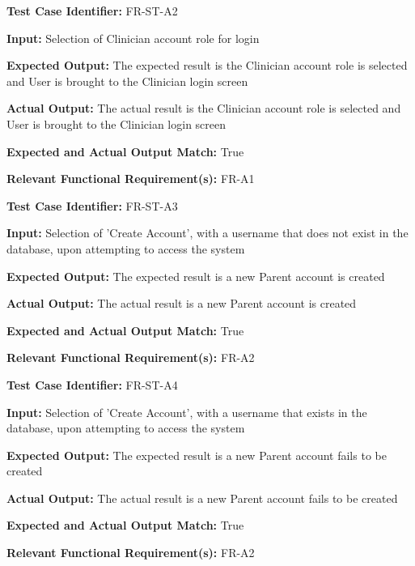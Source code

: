 \documentclass[12pt, titlepage]{article}
\begin{document}
\begin{mdframed}[linewidth=0.5mm] \par
  \textbf{Test Case Identifier:} FR-ST-A2 \par
  \textbf{Input:} Selection of Clinician account role for login \par
  \textbf{Expected Output:} The expected result is the Clinician account role is selected and User is brought to the Clinician login screen \par
  \textbf{Actual Output:} The actual result is the Clinician account role is selected and User is brought to the Clinician login screen \par
  \textbf{Expected and Actual Output Match:} True \par
  \textbf{Relevant Functional Requirement(s):} FR-A1
\end{mdframed}

\begin{mdframed}[linewidth=0.5mm] \par
  \textbf{Test Case Identifier:} FR-ST-A3 \par
  \textbf{Input:} Selection of 'Create Account', with a username that does not exist in the database, upon attempting to access the system \par
  \textbf{Expected Output:} The expected result is a new Parent account is created \par
  \textbf{Actual Output:} The actual result is a new Parent account is created \par
  \textbf{Expected and Actual Output Match:} True \par
  \textbf{Relevant Functional Requirement(s):} FR-A2
\end{mdframed}

\begin{mdframed}[linewidth=0.5mm] \par
  \textbf{Test Case Identifier:} FR-ST-A4 \par
  \textbf{Input:} Selection of 'Create Account', with a username that exists in the database, upon attempting to access the system \par
  \textbf{Expected Output:} The expected result is a new Parent account fails to be created \par
  \textbf{Actual Output:} The actual result is a new Parent account fails to be created \par
  \textbf{Expected and Actual Output Match:} True \par
  \textbf{Relevant Functional Requirement(s):} FR-A2
\end{mdframed}
\end{document}
